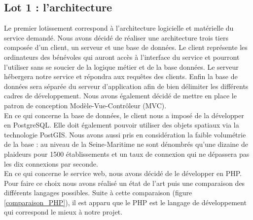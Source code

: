 \documentclass[asi]{picInsa}
\begin{document}
\subsection{Lot 1 : l'architecture}
Le premier lotissement correspond à l'architecture logicielle et matérielle du service demandé. Nous avons décidé de réaliser une architecture trois tiers composée d'un client, un serveur et une base de données. Le client représente les ordinateurs des bénévoles qui auront accès à l'interface du service et pourront l'utiliser sans se soucier de la logique métier et de la base données. Le serveur hébergera notre service et répondra aux requêtes des clients. Enfin la base de données sera séparée du serveur d'application afin de bien délimiter les différents cadres de développement. Nous avons également décidé de mettre en place le patron de conception Modèle-Vue-Contrôleur (MVC).\vspace{0.5cm}\\
En ce qui concerne la base de données, le client nous a imposé de la développer en PostgreSQL. Elle doit également pouvoir utiliser des objets spatiaux via la technologie PostGIS. Nous avons aussi pris en considération la faible volumétrie de la base : au niveau de la Seine-Maritime ne sont dénombrés qu'une dizaine de plaideurs pour 1500 établissements et un taux de connexion qui ne dépassera pas les dix connexions par seconde.\vspace{0.5cm}\\
En ce qui concerne le service web, nous avons décidé de le développer en PHP. Pour faire ce choix nous avons réalisé un état de l'art puis une comparaison des différents langages possibles. Suite à cette comparaison (figure \ref{comparaison_PHP}), il est apparu que le PHP est le langage de développement qui correspond le mieux à notre projet.
\end{document}
